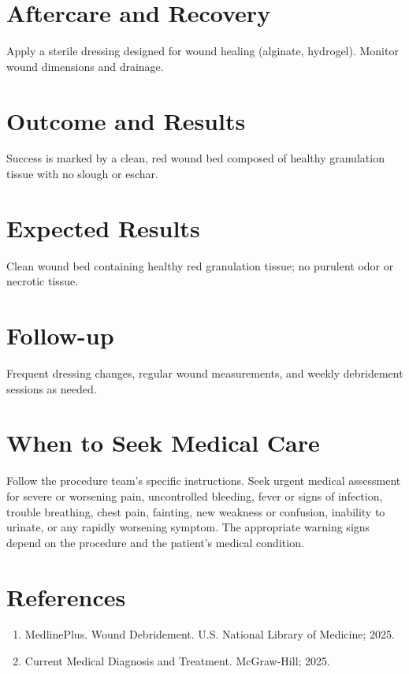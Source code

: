\section*{Aftercare and Recovery}
Apply a sterile dressing designed for wound healing (alginate, hydrogel). Monitor wound dimensions and drainage.

\section*{Outcome and Results}
Success is marked by a clean, red wound bed composed of healthy granulation tissue with no slough or eschar.

\section*{Expected Results}
Clean wound bed containing healthy red granulation tissue; no purulent odor or necrotic tissue.

\section*{Follow-up}
Frequent dressing changes, regular wound measurements, and weekly debridement sessions as needed.

\section*{When to Seek Medical Care}
Follow the procedure team's specific instructions. Seek urgent medical assessment for severe or worsening pain, uncontrolled bleeding, fever or signs of infection, trouble breathing, chest pain, fainting, new weakness or confusion, inability to urinate, or any rapidly worsening symptom. The appropriate warning signs depend on the procedure and the patient's medical condition.

\section*{References}
\begin{enumerate}
  \item MedlinePlus. Wound Debridement. U.S. National Library of Medicine; 2025.
  \item Current Medical Diagnosis and Treatment. McGraw-Hill; 2025.
\end{enumerate}

\clearpage
